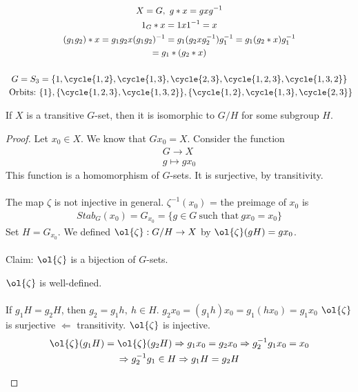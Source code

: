 \documentclass[class=scrartcl, crop=false]{standalone}
\begin{document}
\begin{example}
  \begin{gather*}
    X = G, \ g * x = gxg^{-1}  \\
    1_G * x = 1 x 1^{-1} = x \\
    (g_1g_2)*x = g_1g_2x(g_1g_2)^{-1} = g_1(g_2xg_2^{-1})g_1^{-1} = g_1(g_2*x)g_1^{-1} \\
    = g_1*(g_2*x)
    \\\\
    G = S_3 = \{1, \cycle{1, 2}, \cycle{1, 3}, \cycle{2, 3}, \cycle{1, 2, 3}, \cycle{1, 3, 2}\} \\
    \ \text{Orbits:} \ \{1\}, \{\cycle{1, 2, 3}, \cycle{1, 3, 2}\}, \{\cycle{1, 2}, \cycle{1, 3}, \cycle{2, 3}\}
  \end{gather*} 
  
\end{example} 
\begin{example}
  \begin{proposition}
    If $X$ is a transitive $G$-set, then it is isomorphic to $G / H$ for some subgroup $H$.
    \begin{proof}
      Let $x_0 \in X$. We know that $Gx_0 = X$. Consider the function
      \begin{gather*}
        G \to X \\
        g \mapsto gx_0
      \end{gather*} 
      This function is a homomorphism of $G$-sets. It is surjective, by transitivity.
      \\\\
      The map $\zeta$ is not injective in general. $\zeta^{-1}(x_0)$ = the preimage of $x_0$ is
      \begin{gather*}
        Stab_G(x_0) = G_{x_0} = \{g \in G \ \text{such that} \ gx_0 = x_0\}
      \end{gather*} 
      Set $H = G_{x_0}$. We defined $\ol{\zeta}: G / H \to X$ by $\ol{\zeta}(gH) = gx_0$. 
      \\\\
      Claim: $\ol{\zeta}$ is a bijection of $G$-sets.
      \begin{enumerate}
        \ii
        $\ol{\zeta}$ is well-defined.
        \\\\
        If $g_1H = g_2H$, then $g_2 = g_1h, \ h \in H$. $g_2x_0 = (g_1h)x_0 = g_1(hx_0) = g_1x_0$
        \ii
        $\ol{\zeta}$ is surjective $\Leftarrow$ transitivity.
        \ii
        $\ol{\zeta}$ is injective.
        \begin{gather*}
          \ol{\zeta}(g_1 H) = \ol{\zeta}(g_2H) \Rightarrow g_1x_0 = g_2x_0 \Rightarrow g_2^{-1}g_1x_0 = x_0 \\
          \Rightarrow g_2^{-1}g_1 \in H \Rightarrow g_1H = g_2H
        \end{gather*} 
      \end{enumerate} 
    \end{proof} 
  \end{proposition} 
\end{example} 
\end{document}
